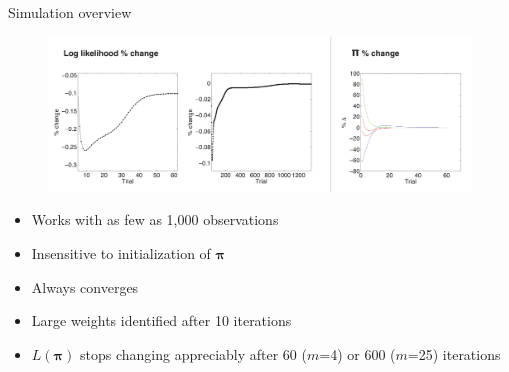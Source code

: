 \documentclass{beamer}
\newcommand{\vect}[1]{\boldsymbol{\mathbf{#1}}}
\newcommand{\vp}{\vect{\pi}}
\newcommand{\llp}{L(\vp)}
\begin{document}
\begin{frame}{Simulation overview}
	
	\begin{figure}
			\begin{center}
				\includegraphics[width=\textwidth]{diag_simple.pdf}
			\end{center}
	\end{figure}
	
	\begin{itemize}
		\item Works with as few as 1,000 observations
		\item Insensitive to initialization of $\vect{\pi}$
		\item Always converges
		\item Large weights identified after 10 iterations
		\item $\llp$ stops changing appreciably after 60 ($m$=4) or 600 ($m$=25) iterations
	\end{itemize}
	
	
	
\end{frame}
\end{document}
